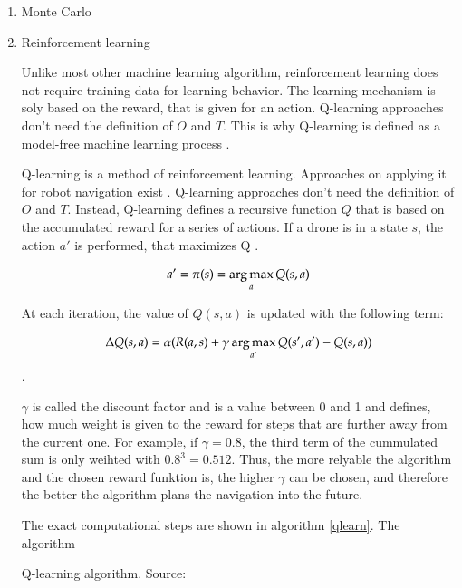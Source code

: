 	\begin{enumerate}
	
	\item{Monte Carlo}
	
	
	\item{Reinforcement learning}
	
	Unlike most other machine learning algorithm, reinforcement learning does not require training data for learning behavior. The learning mechanism is soly based 
	on the reward, that is given for an action. %
	Q-learning approaches don't need the definition of $O$ and $T$. This is why Q-learning is defined as a model-free machine learning process \cite{deep}. 
	
	Q-learning is a method of reinforcement learning. Approaches on applying it for robot navigation exist \cite{accurat}\cite{deep}\cite{lopez}. Q-learning approaches don't need the definition of $O$ and $T$.
	Instead, Q-learning defines a recursive function $Q$ that is based on the accumulated reward for a series of actions. If a drone is in a state $s$, the action $a'$ is performed, 
	that maximizes Q \cite{lopez}. 
	
	$$a' = \pi(s) = \mathop{\mathrm{arg\,max}}_{a} Q(s,a)$$
	
	At each iteration, the value of $Q(s,a)$ is updated with the following term: 
	
	$$ \Delta Q(s,a) = \alpha(R(a,s) + 	\gamma \mathop{\mathrm{arg\,max}}_{a'}Q(s', a') - Q(s, a))$$.
	
	$\gamma$ is called the discount factor and is a value between 0 and 1 and defines, how much weight is given to the reward for steps that are further away from the current one. 
	For example, if $\gamma = 0.8$, the third term of the cummulated sum is only weihted with ${0.8}^3 = 0.512$. Thus, the more relyable the algorithm 
	and the chosen reward funktion is, the higher $\gamma$ can be chosen, and therefore the better the algorithm plans the navigation into the future. 
	
	
	
	The exact computational steps are shown in algorithm \ref{qlearn}. 
	The algorithm 
	
	
	\begin{algorithm}[H]
	\KwData{Parameters: $\alpha \in (0,1], \gamma \in (0,1],$ \ Initialize Q-table with arbitrary Q-values }
	\caption{Q-learning algorithm. Source: \cite{deep}}\label{qlearn}
	\end{algorithm}
	

\end{enumerate}
